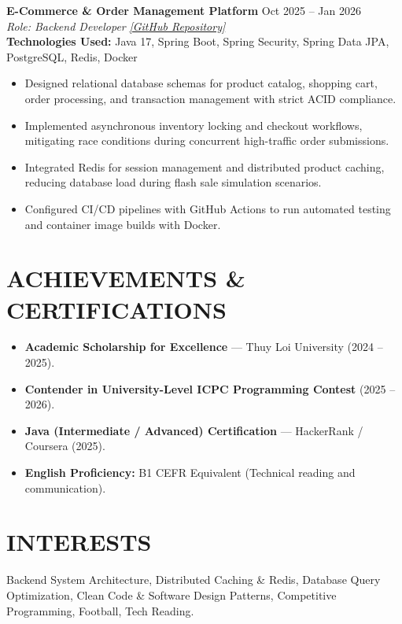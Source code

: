 ﻿\documentclass[11pt,a4paper]{article}
\begin{document}
\vspace{6pt}

\noindent
\textbf{E-Commerce \& Order Management Platform} \hfill Oct 2025 -- Jan 2026 \\
\textit{Role: Backend Developer} \hfill \href{https://github.com/ng-doanh/ecommerce-platform}{\textit{[GitHub Repository]}} \\
\textbf{Technologies Used:} Java 17, Spring Boot, Spring Security, Spring Data JPA, PostgreSQL, Redis, Docker
\begin{itemize}
    \item Designed relational database schemas for product catalog, shopping cart, order processing, and transaction management with strict ACID compliance.
    \item Implemented asynchronous inventory locking and checkout workflows, mitigating race conditions during concurrent high-traffic order submissions.
    \item Integrated Redis for session management and distributed product caching, reducing database load during flash sale simulation scenarios.
    \item Configured CI/CD pipelines with GitHub Actions to run automated testing and container image builds with Docker.
\end{itemize}

\section*{ACHIEVEMENTS \& CERTIFICATIONS}
\begin{itemize}
    \item \textbf{Academic Scholarship for Excellence} --- Thuy Loi University (2024 -- 2025).
    \item \textbf{Contender in University-Level ICPC Programming Contest} (2025 -- 2026).
    \item \textbf{Java (Intermediate / Advanced) Certification} --- HackerRank / Coursera (2025).
    \item \textbf{English Proficiency:} B1 CEFR Equivalent (Technical reading and communication).
\end{itemize}

\section*{INTERESTS}
Backend System Architecture, Distributed Caching \& Redis, Database Query Optimization, Clean Code \& Software Design Patterns, Competitive Programming, Football, Tech Reading.
\end{document}
